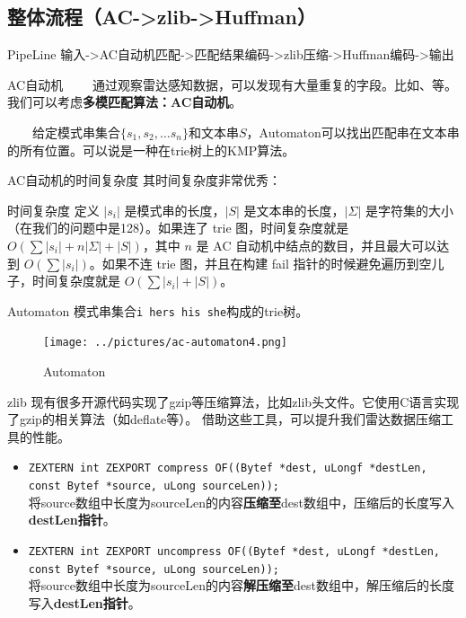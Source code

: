 \documentclass[10pt]{ctexbeamer}
\begin{document}
\subsection{整体流程（AC->zlib->Huffman）}
\begin{frame}{PipeLine}
  输入->AC自动机匹配->匹配结果编码->zlib压缩->Huffman编码->输出
\end{frame}
\begin{frame}{AC自动机}
  \ \ \ \ 通过观察雷达感知数据，可以发现有大量重复的字段。比如、等。
  我们可以考虑\textbf{多模匹配算法：AC自动机}。

  \ \ \ \ 给定模式串集合$\{s_1,s_2,\dots s_n\}$和文本串$S$，Automaton可以找出匹配串在文本串的所有位置。可以说是一种在trie树上的KMP算法。

\end{frame}

\begin{frame}{AC自动机的时间复杂度}
其时间复杂度非常优秀：
\begin{block}{时间复杂度}
  定义 $|s_i|$ 是模式串的长度，$|S|$ 是文本串的长度，$|\Sigma|$ 是字符集的大小（在我们的问题中是128）。如果连了 trie 图，时间复杂度就是 $O(\sum|s_i|+n|\Sigma|+|S|)$，其中 $n$ 是 AC 自动机中结点的数目，并且最大可以达到 $O(\sum|s_i|)$。如果不连 trie 图，并且在构建 fail 指针的时候避免遍历到空儿子，时间复杂度就是 $O(\sum|s_i|+|S|)$。
\end{block} 
\end{frame}

\begin{frame}{Automaton}
  模式串集合\texttt{i\ hers\ his\ she}构成的trie树。
  \begin{figure}[!h]
    \centering
    \texttt{[image: ../pictures/ac-automaton4.png]}
    \caption{Automaton}
  \end{figure}
\end{frame}

\begin{frame}{zlib}
  现有很多开源代码实现了gzip等压缩算法，比如zlib头文件。它使用C语言实现了gzip的相关算法（如deflate等）。
  借助这些工具，可以提升我们雷达数据压缩工具的性能。
  \begin{itemize}
    \item \texttt{ZEXTERN int ZEXPORT compress OF((Bytef *dest,   uLongf *destLen, const Bytef *source, uLong sourceLen));}\\
      将source数组中长度为sourceLen的内容\textbf{压缩至}dest数组中，压缩后的长度写入\textbf{destLen指针}。
    \item \texttt{ZEXTERN int ZEXPORT uncompress OF((Bytef *dest,   uLongf *destLen, const Bytef *source, uLong sourceLen));}\\
    将source数组中长度为sourceLen的内容\textbf{解压缩至}dest数组中，解压缩后的长度写入\textbf{destLen指针}。
  \end{itemize}
\end{frame}
\end{document}
